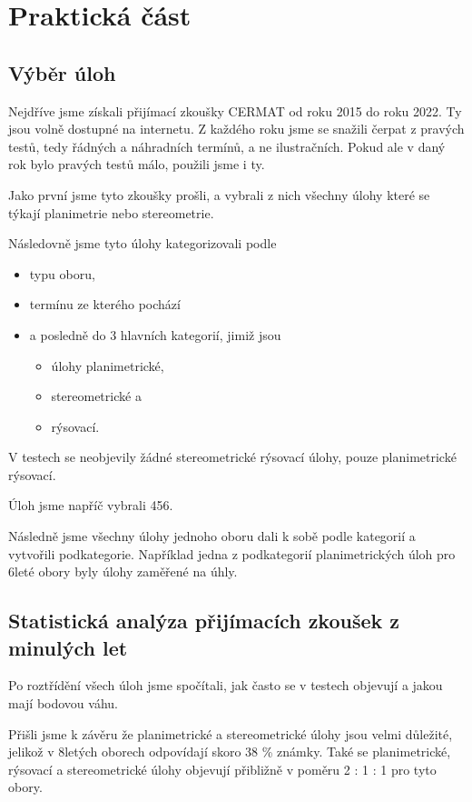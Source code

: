 \chapter{Praktická část}


\section{Výběr úloh}

Nejdříve jsme získali přijímací zkoušky CERMAT od roku 2015 do roku 2022. Ty jsou volně dostupné na internetu. Z každého roku jsme se snažili čerpat z pravých testů, tedy řádných a náhradních termínů, a ne ilustračních. Pokud ale v daný rok bylo pravých testů málo, použili jsme i ty.

Jako první jsme tyto zkoušky prošli, a vybrali z nich všechny úlohy které se týkají planimetrie nebo stereometrie.

Následovně jsme tyto úlohy kategorizovali podle
\begin{itemize}
    \item typu oboru,
    \item termínu ze kterého pochází
    \item a posledně do 3 hlavních kategorií, jimiž jsou
    \begin{itemize}
        \item úlohy planimetrické,
        \item stereometrické a
        \item rýsovací.
    \end{itemize}
\end{itemize}

V testech se neobjevily žádné stereometrické rýsovací úlohy, pouze planimetrické rýsovací.

Úloh jsme napříč vybrali 456.

Následně jsme všechny úlohy jednoho oboru dali k sobě podle kategorií a vytvořili podkategorie. Například jedna z podkategorií planimetrických úloh pro 6leté obory byly úlohy zaměřené na úhly.


\section{Statistická analýza přijímacích zkoušek z minulých let}

Po roztřídění všech úloh jsme spočítali, jak často se v testech objevují a jakou mají bodovou váhu.

Přišli jsme k závěru že planimetrické a stereometrické úlohy jsou velmi důležité, jelikož v 8letých oborech odpovídají skoro 38 \% známky. Také se planimetrické, rýsovací a stereometrické úlohy objevují přibližně v poměru 2 : 1 : 1 pro tyto obory.

